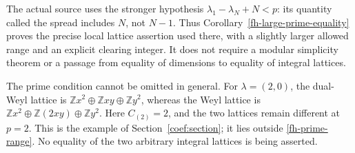 The actual source uses the stronger hypothesis
$\lambda_1-\lambda_N+N<p$: its quantity called the spread
includes $N$, not $N-1$. Thus Corollary~\ref{fh-large-prime-equality}
proves the precise local lattice assertion used there, with a
slightly larger allowed range and an explicit clearing integer.
It does not require a modular simplicity theorem or a passage
from equality of dimensions to equality of integral lattices.

The prime condition cannot be omitted in general. For
$\lambda=(2,0)$, the dual-Weyl lattice is
$\mathbb Zx^2\oplus\mathbb Zxy\oplus\mathbb Zy^2$, whereas
the Weyl lattice is
$\mathbb Zx^2\oplus\mathbb Z(2xy)\oplus\mathbb Zy^2$.
Here $C_{(2)}=2$, and the two lattices remain different at $p=2$.
This is the example of Section~\ref{coef:section}; it lies
outside \eqref{fh-prime-range}. No equality of the two arbitrary
integral lattices is being asserted.


